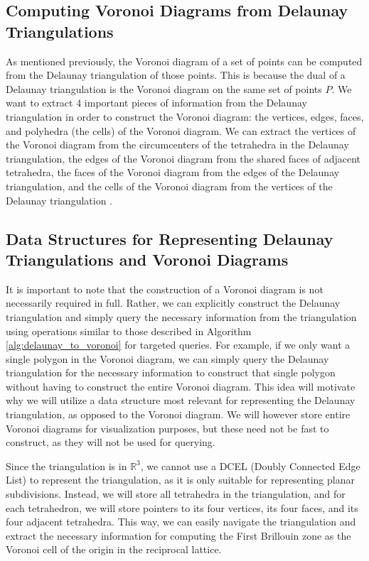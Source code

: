 \documentclass{article}
\begin{document}
\subsection{Computing Voronoi Diagrams from Delaunay Triangulations}
As mentioned previously, the Voronoi diagram of a set of points can be computed from the Delaunay triangulation of those points. This is because the dual of a Delaunay triangulation is the Voronoi diagram on the same set of points $P$. We want to extract 4 important pieces of information from the Delaunay triangulation in order to construct the Voronoi diagram: the vertices, edges, faces, and polyhedra (the cells) of the Voronoi diagram. We can extract the vertices of the Voronoi diagram from the circumcenters of the tetrahedra in the Delaunay triangulation, the edges of the Voronoi diagram from the shared faces of adjacent tetrahedra, the faces of the Voronoi diagram from the edges of the Delaunay triangulation, and the cells of the Voronoi diagram from the vertices of the Delaunay triangulation \cite{delaunay_to_voronoi}.



\subsection{Data Structures for Representing Delaunay Triangulations and Voronoi Diagrams}
It is important to note that the construction of a Voronoi diagram is not necessarily required in full. Rather, we can explicitly construct the Delaunay triangulation and simply query the necessary information from the triangulation using operations similar to those described in Algorithm \ref{alg:delaunay_to_voronoi} for targeted queries. For example, if we only want a single polygon in the Voronoi diagram, we can simply query the Delaunay triangulation for the necessary information to construct that single polygon without having to construct the entire Voronoi diagram. This idea will motivate why we will utilize a data structure most relevant for representing the Delaunay triangulation, as opposed to the Voronoi diagram. We will however store entire Voronoi diagrams for visualization purposes, but these need not be fast to construct, as they will not be used for querying.

Since the triangulation is in $\mathbb{R}^3$, we cannot use a DCEL (Doubly Connected Edge List) to represent the triangulation, as it is only suitable for representing planar subdivisions. Instead, we will store all tetrahedra in the triangulation, and for each tetrahedron, we will store pointers to its four vertices, its four faces, and its four adjacent tetrahedra. This way, we can easily navigate the triangulation and extract the necessary information for computing the First Brillouin zone as the Voronoi cell of the origin in the reciprocal lattice.
\end{document}
